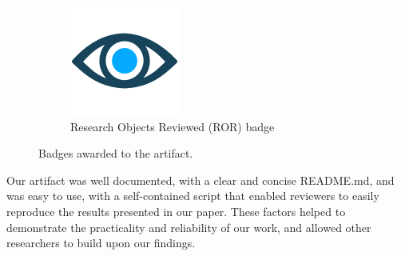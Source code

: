 \begin{figure}[htbp]
\begin{subfigure}{0.3\linewidth}
    \includegraphics[width=\linewidth]{kappa/img/Research_Objects.png}
    \caption{Research Objects Reviewed (ROR) badge}
    \label{fig:ROR}
  \end{subfigure}
  \caption{Badges awarded to the artifact.}
  \label{fig:badges}
\end{figure}

Our artifact was well documented, with a clear and concise README.md, and was easy to 
use, with a self-contained script that enabled reviewers to easily reproduce the 
results presented in our paper. These factors helped to demonstrate the practicality 
and reliability of our work, and allowed other researchers to build upon our findings.


